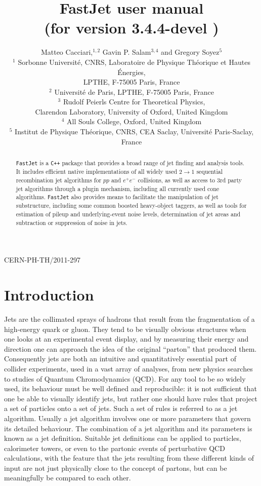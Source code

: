 \documentclass[12pt,a4]{article}
\title{\sf FastJet user manual%
  \\ \large (for version
  3.4.4-devel%
  )
}
\author{Matteo Cacciari,$^{1,2}$ Gavin P. Salam$^{3,4}$ and Gregory Soyez$^{5}$\\[10pt]
  \normalsize
  $^1$ Sorbonne Universit\'e, CNRS, Laboratoire de Physique Th\'eorique et Hautes
  \'Energies,\\[-5pt] \normalsize LPTHE, F-75005 Paris, France\\
    \normalsize
  $^2$ Universit\'e de Paris, LPTHE, F-75005 Paris, France\\
  \normalsize
  $^3$ Rudolf Peierls Centre for Theoretical Physics,\\[-5pt]
  \normalsize
  Clarendon Laboratory, University of Oxford, United Kingdom\\
  \normalsize
  $^4$ All Souls College, Oxford, United Kingdom\\
  \normalsize
  $^5$ Institut de Physique Th\'eorique, CNRS, CEA Saclay, Universit\'e
  Paris-Saclay, France
}
\date{}
\newcommand{\fastjet}{\texttt{FastJet}\xspace}
\newcommand{\ttt}[1]{{\small\texttt{#1}}}
\begin{document}
\maketitle

\vspace{-10cm}
\begin{flushright}
  CERN-PH-TH/2011-297
\end{flushright}
\vspace{9cm}


\begin{abstract}

  \fastjet is a \ttt{C++} package that provides a broad range of jet
  finding and analysis tools.
  It includes efficient native implementations of all widely used $2\to 1$
  sequential recombination jet algorithms for $pp$ and $e^+e^-$
  collisions, as well as access to 3rd party jet algorithms through a
  plugin mechanism, including all currently used cone algorithms.
  \fastjet also provides means to facilitate the manipulation of jet
  substructure, including some common boosted heavy-object taggers, as
  well as tools for estimation of pileup and underlying-event noise
  levels, determination of jet areas and subtraction or suppression
  of noise in jets.

\end{abstract}

\newpage
\tableofcontents
\newpage

\section{Introduction}




Jets are the collimated sprays of hadrons that result from the
fragmentation of a high-energy quark or gluon.
%
They tend to be visually obvious structures when one looks at an
experimental event display, and by measuring their energy and
direction one can approach the idea of the original ``parton'' that
produced them.
%
Consequently jets are both an intuitive and quantitatively essential
part of collider experiments, used in a vast array of analyses, from
new physics searches to studies of Quantum Chromodynamics (QCD).
%
For any tool to be so widely used, its behaviour must be well defined
and reproducible: it is not sufficient that one be able to visually
identify jets, but rather one should have rules that project a set of
particles onto a set of jets.
%
Such a set of rules is referred to as a jet algorithm.
%
Usually a jet algorithm involves one or more parameters that govern
its detailed behaviour.
%
The combination of a jet algorithm and its parameters is known as a
jet definition.
%
Suitable jet definitions can be applied to particles,
calorimeter towers, or even to the partonic events of perturbative QCD
calculations, with the feature that the jets resulting from these
different kinds of input are not just physically close to the
concept of partons, but can be meaningfully be compared to each other.
\end{document}
